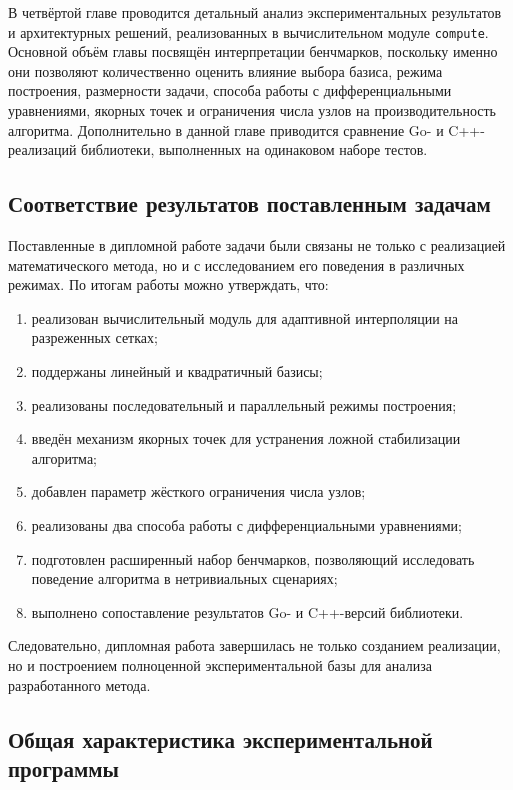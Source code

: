 В четвёртой главе проводится детальный анализ экспериментальных результатов и архитектурных решений, реализованных в вычислительном модуле \texttt{compute}. Основной объём главы посвящён интерпретации бенчмарков, поскольку именно они позволяют количественно оценить влияние выбора базиса, режима построения, размерности задачи, способа работы с дифференциальными уравнениями, якорных точек и ограничения числа узлов на производительность алгоритма. Дополнительно в данной главе приводится сравнение Go- и C++-реализаций библиотеки, выполненных на одинаковом наборе тестов.

\subsection{Соответствие результатов поставленным задачам}

Поставленные в дипломной работе задачи были связаны не только с реализацией математического метода, но и с исследованием его поведения в различных режимах. По итогам работы можно утверждать, что:
\begin{enumerate}
    \item реализован вычислительный модуль для адаптивной интерполяции на разреженных сетках;
    \item поддержаны линейный и квадратичный базисы;
    \item реализованы последовательный и параллельный режимы построения;
    \item введён механизм якорных точек для устранения ложной стабилизации алгоритма;
    \item добавлен параметр жёсткого ограничения числа узлов;
    \item реализованы два способа работы с дифференциальными уравнениями;
    \item подготовлен расширенный набор бенчмарков, позволяющий исследовать поведение алгоритма в нетривиальных сценариях;
    \item выполнено сопоставление результатов Go- и C++-версий библиотеки.
\end{enumerate}

Следовательно, дипломная работа завершилась не только созданием реализации, но и построением полноценной экспериментальной базы для анализа разработанного метода.

\subsection{Общая характеристика экспериментальной программы}

